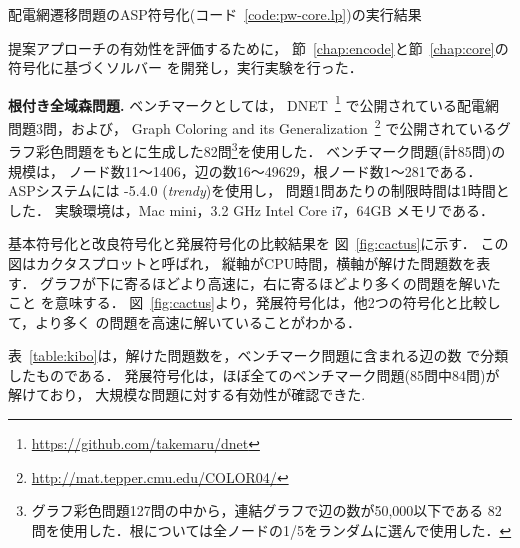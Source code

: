 \begin{table}[t]
  \centering
  \caption{配電網遷移問題のASP符号化(コード~\ref{code:pw-core.lp})の実行結果}
  \label{table:core}
  
\end{table}

提案アプローチの有効性を評価するために，
節~\ref{chap:encode}と節~\ref{chap:core}の符号化に基づくソルバー
を開発し，実行実験を行った．

\textbf{根付き全域森問題.}
ベンチマークとしては，
DNET~\footnote{\url{https://github.com/takemaru/dnet}}
で公開されている配電網問題3問，および，
Graph Coloring and its Generalization~\footnote{\url{http://mat.tepper.cmu.edu/COLOR04/}}
で公開されているグラフ彩色問題をもとに生成した82問\footnote{%
グラフ彩色問題127問の中から，連結グラフで辺の数が50,000以下である
82問を使用した．根については全ノードの1/5をランダムに選んで使用した．
}を使用した．
ベンチマーク問題(計85問)の規模は，
ノード数11〜1406，辺の数16〜49629，根ノード数1〜281である．
%
ASPシステムには {\clingo}-5.4.0 (\textit{trendy})を使用し，
問題1問あたりの制限時間は1時間とした．
実験環境は，Mac mini，3.2 GHz Intel Core i7，64GB メモリである．

基本符号化と改良符号化と発展符号化の比較結果を
図~\ref{fig:cactus}に示す．
この図はカクタスプロットと呼ばれ，
縦軸がCPU時間，横軸が解けた問題数を表す．
グラフが下に寄るほどより高速に，右に寄るほどより多くの問題を解いたこと
を意味する．
図~\ref{fig:cactus}より，発展符号化は，他2つの符号化と比較して，より多く
の問題を高速に解いていることがわかる．

表~\ref{table:kibo}は，解けた問題数を，ベンチマーク問題に含まれる辺の数
で分類したものである．
発展符号化は，ほぼ全てのベンチマーク問題(85問中84問)が解けており，
大規模な問題に対する有効性が確認できた. 


